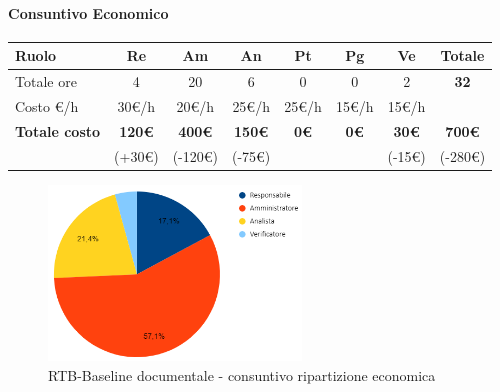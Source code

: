 \paragraph{Consuntivo Economico}
\begin{center}
	\renewcommand{\arraystretch}{1.8} %
	\begin{tabular}{ |m{6em}|c|c|c|c|c|c|c| }
	\hline
	\textbf{Ruolo} & \textbf{Re} & \textbf{Am} &  \textbf{An} &  \textbf{Pt} &  \textbf{Pg} &  \textbf{Ve} &  \textbf{Totale}\\
    \hline
    Totale ore & 4 & 20 & 6 & 0 & 0 & 2 & \textbf{32}\\
    \hline
    Costo \euro/h & 30\euro/h & 20\euro/h & 25\euro/h & 25\euro/h & 15\euro/h & 15\euro/h & \\
    \hline
    \textbf{Totale costo} & \textbf{120\euro} & \textbf{400\euro} &  \textbf{150\euro} & \textbf{0\euro} &  \textbf{0\euro} &  \textbf{30\euro} &  \textbf{700\euro} \\
    & (+30\euro) & (-120\euro) & (-75\euro) &  &  & (-15\euro) & (-280\euro) \\
    \hline
	\end{tabular}

    \begin{figure}[H]
       \centering\includegraphics[width=0.6\textwidth, height=0.6\textheight, keepaspectratio]{images/consuntivo/RTB-documentale-costo.png}
       \caption{RTB-Baseline documentale - consuntivo ripartizione economica}
    \end{figure}
\end{center}


